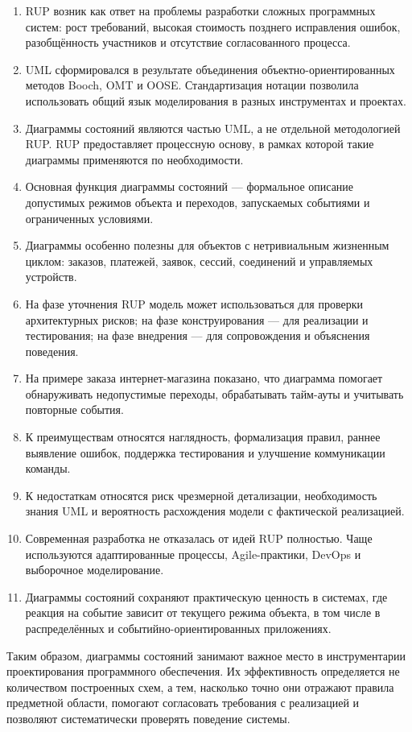 \documentclass[essay,paper]{pmk-graduate}
\begin{document}
\begin{enumerate}
  \item RUP возник как ответ на проблемы разработки сложных программных систем: рост требований, высокая стоимость позднего исправления ошибок, разобщённость участников и отсутствие согласованного процесса.
  \item UML сформировался в результате объединения объектно-ориентированных методов Booch, OMT и OOSE. Стандартизация нотации позволила использовать общий язык моделирования в разных инструментах и проектах.
  \item Диаграммы состояний являются частью UML, а не отдельной методологией RUP. RUP предоставляет процессную основу, в рамках которой такие диаграммы применяются по необходимости.
  \item Основная функция диаграммы состояний — формальное описание допустимых режимов объекта и переходов, запускаемых событиями и ограниченных условиями.
  \item Диаграммы особенно полезны для объектов с нетривиальным жизненным циклом: заказов, платежей, заявок, сессий, соединений и управляемых устройств.
  \item На фазе уточнения RUP модель может использоваться для проверки архитектурных рисков; на фазе конструирования — для реализации и тестирования; на фазе внедрения — для сопровождения и объяснения поведения.
  \item На примере заказа интернет-магазина показано, что диаграмма помогает обнаруживать недопустимые переходы, обрабатывать тайм-ауты и учитывать повторные события.
  \item К преимуществам относятся наглядность, формализация правил, раннее выявление ошибок, поддержка тестирования и улучшение коммуникации команды.
  \item К недостаткам относятся риск чрезмерной детализации, необходимость знания UML и вероятность расхождения модели с фактической реализацией.
  \item Современная разработка не отказалась от идей RUP полностью. Чаще используются адаптированные процессы, Agile-практики, DevOps и выборочное моделирование.
  \item Диаграммы состояний сохраняют практическую ценность в системах, где реакция на событие зависит от текущего режима объекта, в том числе в распределённых и событийно-ориентированных приложениях.
\end{enumerate}

Таким образом, диаграммы состояний занимают важное место в инструментарии проектирования программного обеспечения. Их эффективность определяется не количеством построенных схем, а тем, насколько точно они отражают правила предметной области, помогают согласовать требования с реализацией и позволяют систематически проверять поведение системы.

\nocite{*}
\printthebibliography
\end{document}
